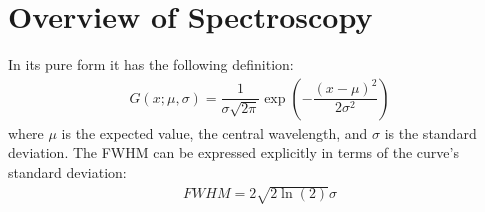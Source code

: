 \chapter{Overview of Spectroscopy}

 In its pure form it has the following definition:
\begin{align}
G(x;\mu,\sigma) = \dfrac{1}{\sigma\sqrt{2 \pi}}\exp{\left(-\dfrac{(x-\mu)^2}{2 \sigma^2} \right )}
\end{align}
where $\mu$ is the expected value, the central wavelength, and $\sigma$ is the standard deviation. The FWHM can be expressed explicitly in terms of the curve's standard deviation:
\begin{align}
FWHM =  2 \sqrt{2 \ln (2) } \sigma
\end{align}

